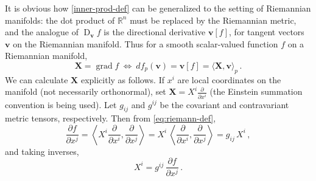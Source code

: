 \documentclass{article}
\newcommand{\real}{\mathbb{R}}
\DeclareMathOperator{\D}{D}
\newcommand{\vv}{\mathbf{v}}
\newcommand{\vX}{\mathbf{X}}
\newcommand{\grad}{\operatorname{grad}}
\begin{document}
It is obvious how \eqref{inner-prod-def}
can be generalized to the setting of Riemannian manifolds:
the dot product of $\real^n$ must be replaced
by the Riemannian metric, and the analogue
of $\D_\vv f$ is the directional derivative $\vv[f]$, for tangent vectors $\vv$ on the Riemannian manifold.
Thus for a smooth scalar-valued function $f$ on a Riemannian manifold,
\begin{equation}\label{eq:riemann-def}
\vX = \grad f  \: \Leftrightarrow \: df_p(\vv) = \vv[f] = \langle \vX, \vv \rangle_p\,.
\end{equation}
We can calculate $\vX$ explicitly as follows.
If $x^i$ are local coordinates on the manifold (not necessarily orthonormal),
set $\vX = X^i \frac{\partial}{\partial x^i}$ (the Einstein summation convention is being used).
Let $ g_{ij}$ and $ g^{ij}$ be the covariant and contravariant metric tensors, respectively.
Then from \eqref{eq:riemann-def},
\[
\frac{\partial f}{\partial x^j} = \left\langle X^i 
\frac{\partial}{\partial x^i}, \frac{\partial}{\partial x^j} \right\rangle
= X^i \, \left\langle \frac{\partial}{\partial x^i}, \frac{\partial}{\partial x^j} \right\rangle 
=  g_{ij} \, X^i\,,
\]
and taking inverses,
\begin{equation}\label{eq:gendef}
X^i = g^{ij} \, \frac{\partial f}{\partial x^j}\,.
\end{equation}
\end{document}
